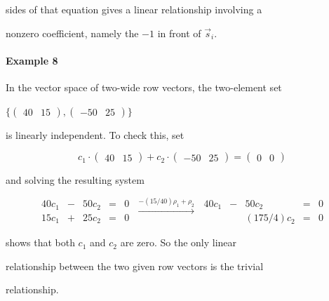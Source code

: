     sides of that equation gives a linear relationship involving a

    nonzero coefficient, namely the $-1$ in front of $\vec{s}_i$.



\paragraph{Example 8}



In the vector space of two-wide row vectors, the two-element set

$\{ \begin{pmatrix} 40 &15 \end{pmatrix},\begin{pmatrix} -50 &25 \end{pmatrix}\}$

is linearly independent. To check this, set



$$c_1\cdot\begin{pmatrix} 40 &15 \end{pmatrix}+c_2\cdot\begin{pmatrix} -50 &25 \end{pmatrix}=\begin{pmatrix} 0 &0 \end{pmatrix}$$



and solving the resulting system



$$\begin{array}{*{2}{rc}r}

40c_1 &- &50c_2 &= &0 \\15c_1 &+ &25c_2 &= &0

\end{array}

\;\xrightarrow[]{-(15/40)\rho_1+\rho_2}\;

\begin{array}{*{2}{rc}r}

40c_1 &- &50c_2    &= &0 \\& &(175/4)c_2 &= &0

\end{array}$$



shows that both $c_1$ and $c_2$ are zero. So the only linear

relationship between the two given row vectors is the trivial

relationship.



